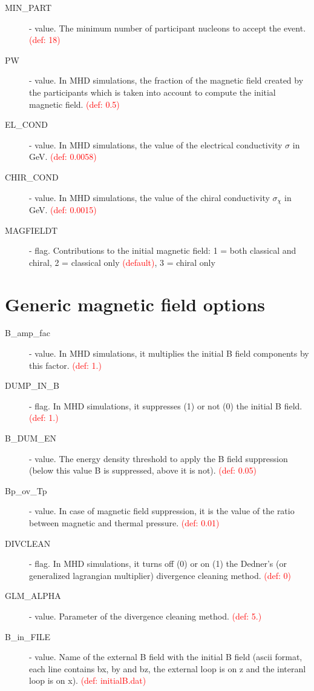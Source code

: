\begin{description}
\item[MIN\_PART]  \integer - value. The minimum number of participant nucleons to accept the event.  \textcolor{red}{(def: 18)} 
\item[PW] \real - value. In MHD simulations, the fraction of the magnetic field created by the participants which is taken into account to compute the initial magnetic field. \textcolor{red}{(def: 0.5)}
\item[EL\_COND] \real - value. In MHD simulations, the value of the electrical conductivity $\sigma$ in GeV. \textcolor{red}{(def: 0.0058)}
\item[CHIR\_COND] \real - value. In MHD simulations, the value of the chiral conductivity $\sigma_{\chi}$ in GeV. \textcolor{red}{(def: 0.0015)}
\item[MAGFIELDT] \integer - flag. Contributions to the initial magnetic field: 1 = both classical and chiral, 2 = classical only \textcolor{red}{(default)}, 3 = chiral only
\end{description}

\section{Generic magnetic field options}
\begin{description}
\item[B\_amp\_fac] \real - value. In MHD simulations, it multiplies the initial B field components by this factor. \textcolor{red}{(def: 1.)}
\item[DUMP\_IN\_B] \integer - flag. In MHD simulations, it suppresses (1) or not (0) the initial B field. \textcolor{red}{(def: 1.)}
\item[B\_DUM\_EN] \real - value. The energy density threshold to apply the B field suppression (below this value B is suppressed, above it is not). \textcolor{red}{(def: 0.05)}
\item[Bp\_ov\_Tp] \real - value. In case of magnetic field suppression, it is the value of the ratio between magnetic and thermal pressure. \textcolor{red}{(def: 0.01)}
\item[DIVCLEAN] \integer - flag. In MHD simulations, it turns off (0) or on (1) the Dedner's (or generalized lagrangian multiplier) divergence cleaning method. \textcolor{red}{(def: 0)}
\item[GLM\_ALPHA] \real - value. Parameter of the divergence cleaning method. \textcolor{red}{(def: 5.)}
\item[B\_in\_FILE] \chara - value. Name of the external B field with the initial B field (ascii format, each line contains bx, by and bz, the external loop is on z and the interanl loop is on x). \textcolor{red}{(def: initialB.dat)}
\end{description}

